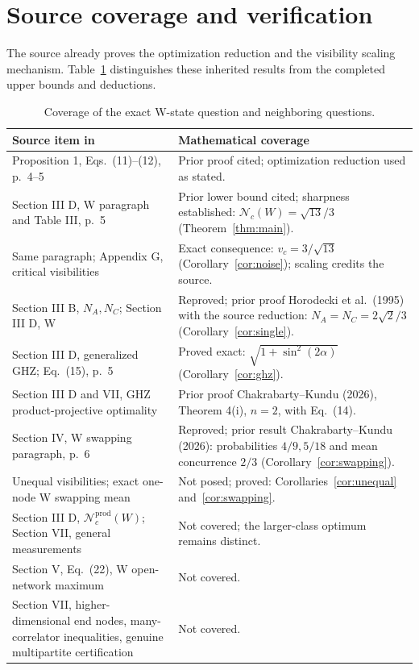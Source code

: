 \documentclass[11pt,a4paper]{article}
\newcommand{\Nc}{\mathcal N_c}
\begin{document}
\section{Source coverage and verification}
The source already proves the optimization reduction and the
visibility scaling mechanism. Table~\ref{tab:coverage} distinguishes
these inherited results from the completed upper bounds and deductions.

\begin{table}[ht]
\centering\small
\begin{tabular}{@{}p{.43\linewidth}p{.51\linewidth}@{}}
\toprule
Source item in \cite{CK} & Mathematical coverage\\
\midrule
Proposition 1, Eqs.~(11)--(12), p.~4--5 & Prior proof cited; optimization
reduction used as stated.\\[3pt]
Section III D, W paragraph and Table III, p.~5 & Prior lower bound cited;
sharpness established: $\Nc(W)=\sqrt{13}/3$ (Theorem~\ref{thm:main}).\\[3pt]
Same paragraph; Appendix G, critical visibilities & Exact consequence:
$v_c=3/\sqrt{13}$ (Corollary~\ref{cor:noise}); scaling credits the source.\\[3pt]
Section III B, $N_A,N_C$; Section III D, W & Reproved; prior proof
Horodecki et al.~(1995) with the source reduction:
$N_A=N_C=2\sqrt2/3$ (Corollary~\ref{cor:single}).\\[3pt]
Section III D, generalized GHZ; Eq.~(15), p.~5 & Proved exact:
$\sqrt{1+\sin^2(2\alpha)}$ (Corollary~\ref{cor:ghz}).\\[3pt]
Section III D and VII, GHZ product-projective optimality & Prior proof
Chakrabarty--Kundu (2026), Theorem 4(i), $n=2$, with Eq.~(14).\\[3pt]
Section IV, W swapping paragraph, p.~6 & Reproved; prior result
Chakrabarty--Kundu (2026): probabilities $4/9,5/18$ and mean
concurrence $2/3$ (Corollary~\ref{cor:swapping}).\\[3pt]
Unequal visibilities; exact one-node W swapping mean & Not posed;
proved: Corollaries~\ref{cor:unequal} and~\ref{cor:swapping}.\\[3pt]
Section III D, $\mathcal N_c^{\mathrm{prod}}(W)$; Section VII,
general measurements & Not covered; the larger-class optimum remains distinct.\\[3pt]
Section V, Eq.~(22), W open-network maximum & Not covered.\\[3pt]
Section VII, higher-dimensional end nodes, many-correlator inequalities,
genuine multipartite certification & Not covered.\\
\bottomrule
\end{tabular}
\caption{Coverage of the exact W-state question and neighboring questions.}
\label{tab:coverage}
\end{table}
\end{document}
